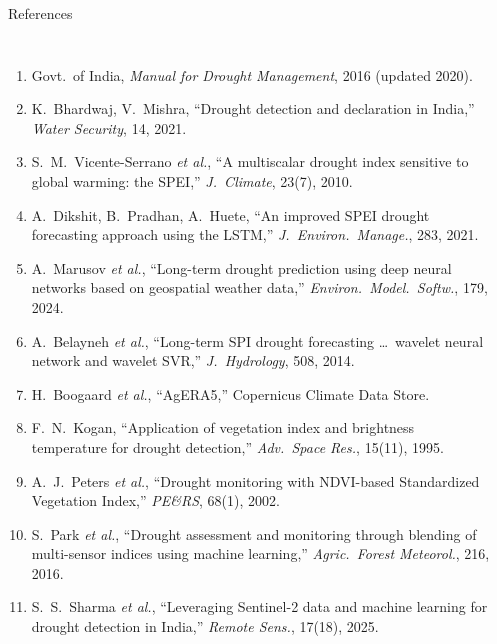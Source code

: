 \documentclass[aspectratio=169,10pt]{beamer}
\begin{document}
\begin{frame}{References}
\fontsize{6.5}{7.7}\selectfont
\begin{columns}[T,onlytextwidth]
\begin{enumerate}\setlength{\itemsep}{0.6pt}
\item Govt.\ of India, \emph{Manual for Drought Management}, 2016 (updated 2020).
\item K.~Bhardwaj, V.~Mishra, ``Drought detection and declaration in India,'' \emph{Water Security}, 14, 2021.
\item S.~M.~Vicente-Serrano \emph{et al.}, ``A multiscalar drought index sensitive to global warming: the SPEI,'' \emph{J.\ Climate}, 23(7), 2010.
\item A.~Dikshit, B.~Pradhan, A.~Huete, ``An improved SPEI drought forecasting approach using the LSTM,'' \emph{J.\ Environ.\ Manage.}, 283, 2021.
\item A.~Marusov \emph{et al.}, ``Long-term drought prediction using deep neural networks based on geospatial weather data,'' \emph{Environ.\ Model.\ Softw.}, 179, 2024.
\item A.~Belayneh \emph{et al.}, ``Long-term SPI drought forecasting \ldots\ wavelet neural network and wavelet SVR,'' \emph{J.\ Hydrology}, 508, 2014.
\item H.~Boogaard \emph{et al.}, ``AgERA5,'' Copernicus Climate Data Store.
\item F.~N.~Kogan, ``Application of vegetation index and brightness temperature for drought detection,'' \emph{Adv.\ Space Res.}, 15(11), 1995.
\item A.~J.~Peters \emph{et al.}, ``Drought monitoring with NDVI-based Standardized Vegetation Index,'' \emph{PE\&RS}, 68(1), 2002.
\item S.~Park \emph{et al.}, ``Drought assessment and monitoring through blending of multi-sensor indices using machine learning,'' \emph{Agric.\ Forest Meteorol.}, 216, 2016.
\item S.~S.~Sharma \emph{et al.}, ``Leveraging Sentinel-2 data and machine learning for drought detection in India,'' \emph{Remote Sens.}, 17(18), 2025.
\end{enumerate}
\begin{enumerate}\setcounter{enumi}{11}\setlength{\itemsep}{0.6pt}

\end{enumerate}
\end{columns}
\end{frame}
\end{document}
